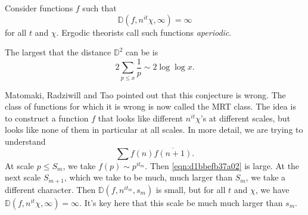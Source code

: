 \documentclass[reqno]{amsart} 
\begin{document}
\begin{remark}
  Consider functions $f$ such that
  \begin{equation*}
    \mathbb{D} (f, n^{i t } \chi, \infty ) = \infty
  \end{equation*}
  for all $t$ and $\chi$.  Ergodic theorists call such functions \emph{aperiodic}.
\end{remark}
\begin{remark}
  The largest that the distance $\mathbb{D}^2$ can be is
  \begin{equation*}
    2 \sum_{p \leq x} \frac{1}{p} \sim 2 \log \log x.
  \end{equation*}
\end{remark}
Matomaki, Radziwill and Tao pointed out that this conjecture is wrong.  The class of functions for which it is wrong is now called the MRT class.  The idea is to construct a function $f$ that looks like different $n^{it } \chi$'s at different scales, but looks like none of them in particular at all scales.  In more detail, we are trying to understand
\begin{equation}\label{eqn:d1bbefb37a02}
  \sum f (n) \overline{f (n + 1)}.
\end{equation}
At scale $p \leq S_m $, we take $f (p) \sim p^{i t_m }$.  Then \eqref{eqn:d1bbefb37a02} is large.  At the next scale $S_{m+1}$, which we take to be much, much larger than $S_m$, we take a different character.  Then $\mathbb{D} (f, n^{i t_m }, s_m )$ is small, but for all $t$ and $\chi$, we have $\mathbb{D} (f, n^{i t } \chi, \infty ) = \infty $.  It's key here that this scale be much much larger than $s_m$.
\end{document}
